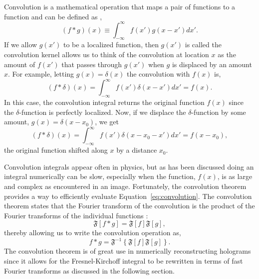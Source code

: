             Convolution is a mathematical operation that maps a pair of
            functions to a function and can be defined as \cite{DanielSteck},
            \begin{equation}
                (f*g)(x) \equiv \int_{-\infty}^{\infty} f(x')g(x-x')dx' .
                \label{eq:convolution}
            \end{equation}
            If we allow $g(x')$ to be a localized function,
            then $g(x')$ is called the convolution kernel
            allows us to think of the convolution
            at location $x$ as the amount of $f(x')$ that passes
            through $g(x')$ when $g$ is displaced by an amount $x$. For example,
            letting $g(x) = \delta(x)$ the convolution with $f(x)$ is,
            \begin{equation}
                (f*\delta)(x)=\int_{-\infty}^{\infty}f(x')\delta(x-x')dx'=f(x).
            \end{equation}
            In this case, the convolution integral returns the original function $f(x)$
            since
            the $\delta$-function is perfectly localized.
            Now, if we displace the $\delta$-function by some amount, $g(x)=\delta(x-x_0)$,
            we get
            \begin{equation}
                (f*\delta)(x)=\int_{-\infty}^{\infty}f(x')\delta(x-x_0-x')dx'=f(x-x_0),
            \end{equation}
            the original function shifted along $x$ by a distance $x_0$.

            Convolution integrals appear often in physics, but as has been discussed doing an
            integral numerically can be slow, especially when the function, $f(x)$,
            is as large and complex as encountered in an image. 
            Fortunately, the convolution theorem provides a way to efficiently evaluate
            Equation~\ref{eq:convolution}. The convolution theorem states that the
            Fourier transform of the convolution is the product of the Fourier
            transforms of the individual functions \cite{DanielSteck}:
            \begin{equation}
                \mathfrak{F}\left[ f*g
                \right]=\mathfrak{F}[f]\mathfrak{F}[g] ,
            \end{equation}
            thereby allowing us to write the convolution operation as,
            \begin{equation}
                f*g = \mathfrak{F}^{-1}\left\{\mathfrak{F}[f]\mathfrak{F}[g]
            \right\}.
            \end{equation}
            The convolution theorem is of great use in numerically
            reconstructing holograms since it allows for the Fresnel-Kirchoff
            integral to be rewritten in terms of fast Fourier transforms as
            discussed in the following section.

